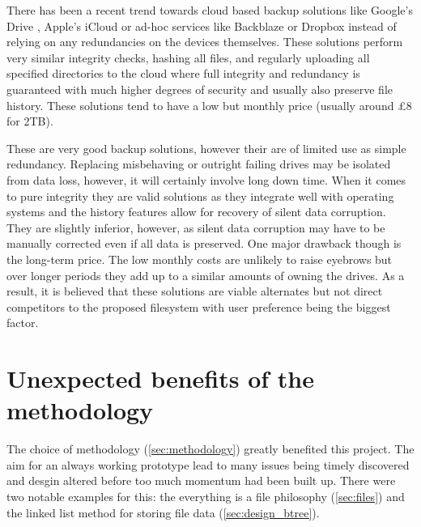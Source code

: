         There has been a recent trend towards cloud based backup solutions like
        Google's Drive \cite{gdrive}, Apple's iCloud \cite{icloud} or ad-hoc
        services like Backblaze \cite{Backblaze_321} or Dropbox \cite{dropbox}
        instead of relying on any redundancies on the devices themselves. These
        solutions perform very similar integrity checks, hashing all files, and
        regularly uploading all specified directories to the cloud where full
        integrity and redundancy is guaranteed \cite{Backblaze_arch} with much
        higher degrees of security and usually also preserve file history.
        These solutions tend to have a low but monthly price (usually around
        £8 for 2TB).

        These are very good backup solutions, however their are of limited use
        as simple redundancy. Replacing misbehaving or outright failing drives
        may be isolated from data loss, however, it will certainly involve long
        down time. When it comes to pure integrity they are valid solutions as
        they integrate well with operating systems and the history features
        allow for recovery of silent data corruption. They are slightly
        inferior, however, as silent data corruption may have to be manually
        corrected even if all data is preserved. One major drawback though is
        the long-term price. The low monthly costs are unlikely to raise
        eyebrows but over longer periods they add up to a similar amounts of
        owning the drives. As a result, it is believed that these solutions are
        viable alternates but not direct competitors to the proposed
        filesystem with user preference being the biggest factor.


    \section{Unexpected benefits of the methodology}

        The choice of methodology (\autoref{sec:methodology}) greatly benefited
        this project. The aim for an always working prototype lead to many
        issues being timely discovered and desgin altered before too much
        momentum had been built up. There were two notable examples for this:
        the everything is a file philosophy (\autoref{sec:files}) and the linked
        list method for storing file data (\autoref{sec:design_btree}).

